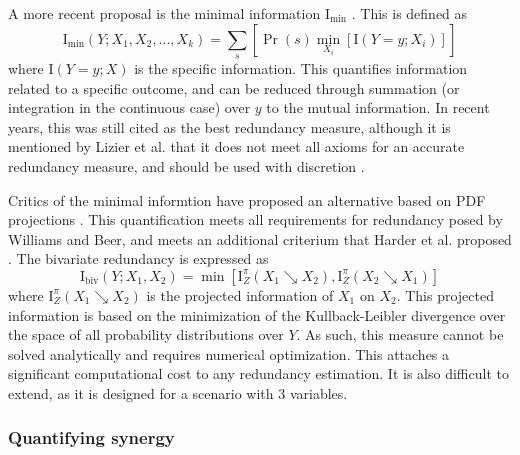 \documentclass[../main.tex]{subfiles}
\begin{document}
A more recent proposal is the minimal information $\mathrm{I}_\mathrm{min}$ \cite{williams2010nonnegative}.
This is defined as
%
\begin{equation}
\mathrm{I}_\mathrm{min} \left( Y;{X_1, X_2,...,X_k} \right) = \sum_s [\Pr \left( s \right) \min_{X_i} [\mathrm{I}\left( Y=y;X_i \right)]]
\end{equation}
%
where $\mathrm{I}\left( Y = y;X \right)$ is the specific information.
This quantifies information related to a specific outcome, and can be reduced through summation (or integration in the continuous case) over $y$ to the mutual information.
In recent years, this was still cited as the best redundancy measure, although it is mentioned by Lizier et al. that it does not meet all axioms for an accurate redundancy measure, and should be used with discretion \cite{lizier2013towards, olbrich2015information}.

Critics of the minimal informtion have proposed an alternative based on PDF projections \cite{harder2013bivariate}.
This quantification meets all requirements for redundancy posed by Williams and Beer, and meets an additional criterium that Harder et al. proposed \cite{williams2010nonnegative, harder2013bivariate}.
The bivariate redundancy is expressed as
%
\begin{equation}
\mathrm{I}_\mathrm{biv} \left( Y;{X_1, X_2} \right) = \min [\mathrm{I}_Z^\pi \left( X_1 \searrow X_2 \right), \mathrm{I}_Z^\pi \left( X_2 \searrow X_1 \right)]
\end{equation}
%
where $\mathrm{I}_Z^\pi \left( X_1 \searrow X_2 \right)$ is the projected information of $X_1$ on $X_2$.
This projected information is based on the minimization of the Kullback-Leibler divergence over the space of all probability distributions over $Y$.
As such, this measure cannot be solved analytically and requires numerical optimization.
This attaches a significant computational cost to any redundancy estimation.
It is also difficult to extend, as it is designed for a scenario with 3 variables. %

\subsubsection{Quantifying synergy}
\end{document}
